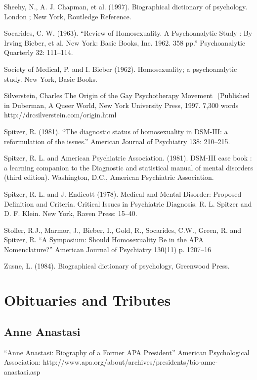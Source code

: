 \begin{refsection}
\begin{appendices}
Sheehy, N., A. J. Chapman, et al. (1997). Biographical dictionary of psychology. London ; New York, Routledge Reference.

Socarides, C. W. (1963). ``Review of Homosexuality. A Psychoanalytic Study : By Irving Bieber, et al. New York: Basic Books, Inc. 1962. 358 pp.'' Psychoanalytic Quarterly 32: 111--114.

Society of Medical, P. and I. Bieber (1962). Homosexuality; a psychoanalytic study. New York, Basic Books.

Silverstein, Charles The Origin of the Gay Psychotherapy Movement
 (Published in Duberman, A Queer World, New York University Press, 1997. 7,300 words http:\slash \slash drcsilverstein.com\slash origin.html

Spitzer, R. (1981). ``The diagnostic status of homosexuality in DSM-III: a reformulation of the issues.'' American Journal of Psychiatry 138: 210--215.

Spitzer, R. L. and American Psychiatric Association. (1981). DSM-III case book : a learning companion to the Diagnostic and statistical manual of mental disorders (third edition). Washington, D.C., American Psychiatric Association.

Spitzer, R. L. and J. Endicott (1978). Medical and Mental Disorder: Proposed Definition and Criteria. Critical Issues in Psychiatric Diagnosis. R. L. Spitzer and D. F. Klein. New York, Raven Press: 15--40.

Stoller, R.J., Marmor, J., Bieber, I., Gold, R., Socarides, C.W., Green, R. and Spitzer, R. ``A Symposium: Should Homosexuality Be in the APA Nomenclature?'' American Journal of Psychiatry 130(11) p. 1207--16

Zusne, L. (1984). Biographical dictionary of psychology, Greenwood Press.

\section{Obituaries and Tributes}
\label{obituariesandtributes}

\subsection{Anne Anastasi}
\label{anneanastasi}

``Anne Anastasi: Biography of a Former APA President'' American Psychological Association: http:\slash \slash www.apa.org\slash about\slash archives\slash presidents\slash bio-anne-anastasi.asp


\end{appendices}
\end{refsection}
